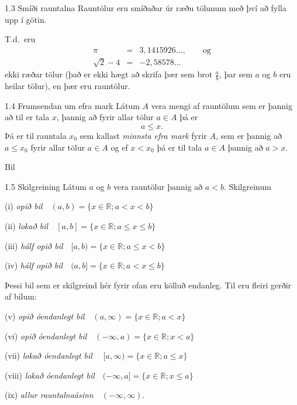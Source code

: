 \documentclass[icelandic,a4paper,12pt]{article}
\newcommand{\R}{{\mathbb  R}}
\begin{document}
\begin{frame}
\begin{block}{1.3 Smíði rauntalna}  Rauntölur eru smíðaðar úr ræðu tölunum
með því að fylla upp í götin. 

\pause

T.d.~eru 
\begin{eqnarray*}
\pi &=& 3,1415926\ldots, \qquad \text{og}\\
\sqrt 2 -4  &=& -2,58578\ldots
\end{eqnarray*}
ekki ræðar tölur (það er ekki hægt að skrifa þær sem brot $\frac ab$, 
þar sem $a$ og $b$ eru heilar tölur), en þær eru rauntölur.
\end{block}

\pause


\begin{block}{1.4 Frumsendan um efra mark}  
Látum $A$ vera mengi af  rauntölum
sem er þannig að til er tala $x$, þannig að 
fyrir allar tölur $a \in A$ þá er 
$$a\leq x.$$ 
Þá er til rauntala $x_0$ sem kallast {\em minnsta efra mark} fyrir
$A$, sem er þannig að  $a\leq x_0$ fyrir allar tölur $a\in
A$ og ef $x<x_0$ þá er til tala $a\in A$ þannig að $a>x$.  
\end{block}
\end{frame}


\begin{frame}{Bil}
\begin{block}{1.5 Skilgreining}  
Látum $a$ og $b$ vera rauntölur þannig að $a<b$.  
Skilgreinum 

(i) {\em opið bil}\ \ $(a,b)=\{x\in \R ; a<x<b\}$

(ii) {\em lokað bil}\ \ $[a,b]=\{x\in \R ; a\leq x\leq b\}$

(iii) {\em hálf opið bil}\ \ $[a,b)=\{x\in \R ; a\leq x<b\}$

(iv) {\em hálf opið bil}\ \ $(a,b]=\{x\in \R ; a< x\leq b\}$

\medskip

Þessi bil sem er skilgreind hér fyrir ofan eru kölluð endanleg.  Til
eru fleiri gerðir af bilum:


(v)  {\em opið óendanlegt bil}\ \    $(a,\infty)=\{x\in \R ; a<x\}$

(vi)  {\em opið óendanlegt bil}\ \    $(-\infty, a)=\{x\in \R ; x<a\}$

(vii)  {\em lokað óendanlegt bil} \ \ $[a,\infty)=\{x\in \R ; a\leq x\}$

(viii)  {\em lokað óendanlegt bil}\ \  $(-\infty, a]=\{x\in \R ; x\leq a\}$

(ix)  {\em allur rauntalnaásinn}\ \  $(-\infty, \infty)$.

\end{block}
\end{frame}
\end{document}
